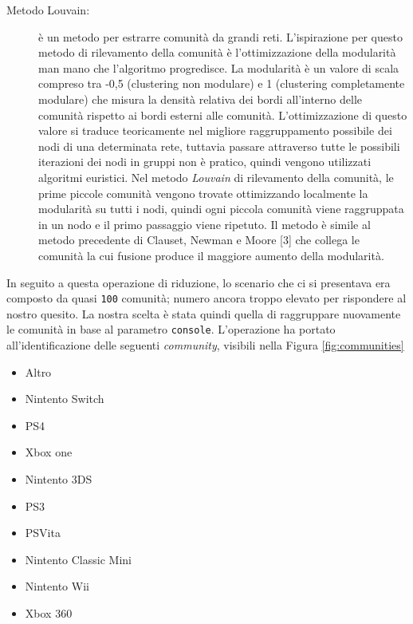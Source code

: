 			\begin{description}
				\item [Metodo Louvain:] è un metodo per estrarre comunità da grandi reti. L'ispirazione per questo metodo di rilevamento della comunità è l'ottimizzazione della modularità man mano che l'algoritmo progredisce. La modularità è un valore di scala compreso tra -0,5 (clustering non modulare) e 1 (clustering completamente modulare) che misura la densità relativa dei bordi all'interno delle comunità rispetto ai bordi esterni alle comunità. L'ottimizzazione di questo valore si traduce teoricamente nel migliore raggruppamento possibile dei nodi di una determinata rete, tuttavia passare attraverso tutte le possibili iterazioni dei nodi in gruppi non è pratico, quindi vengono utilizzati algoritmi euristici. Nel metodo \textit{Louvain} di rilevamento della comunità, le prime piccole comunità vengono trovate ottimizzando localmente la modularità su tutti i nodi, quindi ogni piccola comunità viene raggruppata in un nodo e il primo passaggio viene ripetuto. Il metodo è simile al metodo precedente di Clauset, Newman e Moore [3] che collega le comunità la cui fusione produce il maggiore aumento della modularità.
			\end{description}

			In seguito a questa operazione di riduzione, lo scenario che ci si presentava era composto da quasi \verb|100| comunità; numero ancora troppo elevato per rispondere al nostro quesito. La nostra scelta è stata quindi quella di raggruppare nuovamente le comunità in base al parametro \verb|console|. L'operazione ha portato all'identificazione delle seguenti \textit{community}, visibili nella Figura \ref{fig:communities}
			\begin{itemize}			
				\item Altro
				\item Nintento Switch
				\item PS4
				\item Xbox one
				\item Nintento 3DS
				\item PS3
				\item PSVita
				\item Nintento Classic Mini
				\item Nintento Wii
				\item Xbox 360
			\end{itemize}
		
